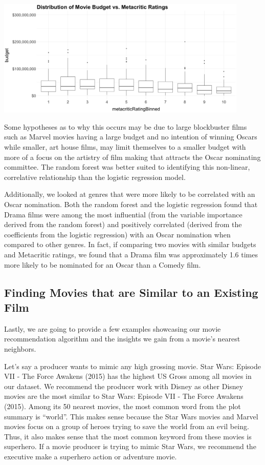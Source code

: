 \documentclass[10pt]{article}
\begin{document}
\begin{center}
\includegraphics[width=12cm]{_assets/_eda/eda__boxplot_budget_vs_metacritic_binned.png}
\end{center}

Some hypotheses as to why this occurs may be due to large blockbuster films such as Marvel movies having a large budget and no intention of winning Oscars while smaller, art house films, may limit themselves to a smaller budget with more of a focus on the artistry of film making that attracts the Oscar nominating committee. The random forest was better suited to identifying this non-linear, correlative relationship than the logistic regression model.

Additionally, we looked at genres that were more likely to be correlated with an Oscar nomination. Both the random forest and the logistic regression found that Drama films were among the most influential (from the variable importance derived from the random forest) and positively correlated (derived from the coefficients from the logistic regression) with an Oscar nomination when compared to other genres. In fact, if comparing two movies with similar budgets and Metacritic ratings, we found that a Drama film was approximately 1.6 times more likely to be nominated for an Oscar than a Comedy film.

\subsection{Finding Movies that are Similar to an Existing Film}

Lastly, we are going to provide a few examples showcasing our movie recommendation algorithm and the insights we gain from a movie’s nearest neighbors.

Let’s say a producer wants to mimic any high grossing movie. Star Wars: Episode VII - The Force Awakens (2015) has the highest US Gross among all movies in our dataset. We recommend the producer work with Disney as other Disney movies are the most similar to Star Wars: Episode VII - The Force Awakens (2015). Among its 50 nearest movies, the most common word from the plot summary is “world”. This makes sense because the Star Wars movies and Marvel movies focus on a group of heroes trying to save the world from an evil being. Thus, it also makes sense that the most common keyword from these movies is superhero. If a movie producer is trying to mimic Star Wars, we recommend the executive make a superhero action or adventure movie.
\end{document}
